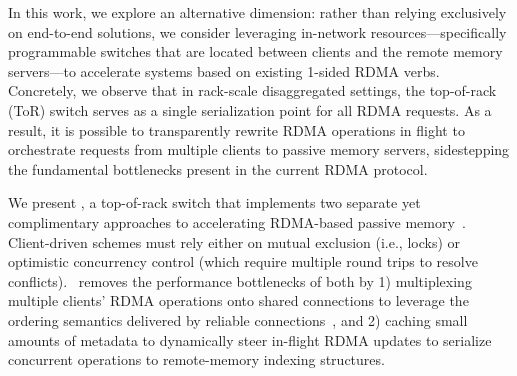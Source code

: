
In this work, we explore an alternative dimension: rather than relying
exclusively on end-to-end solutions, we consider leveraging in-network
resources---specifically programmable switches that are located between
clients and the remote memory servers---to accelerate systems based on
existing 1-sided RDMA verbs.  Concretely, we observe that in
rack-scale disaggregated settings, the top-of-rack (ToR) switch serves as a
single serialization point for all RDMA requests.  As a result, it is
possible to transparently rewrite RDMA operations in flight to
orchestrate requests from multiple clients to passive memory servers,
sidestepping the fundamental bottlenecks present in the current
RDMA protocol.



We present \sword, a top-of-rack switch that implements two separate
yet complimentary approaches to accelerating RDMA-based passive
memory~\cite{Grant2021InContRes}.  Client-driven schemes must rely
either on mutual exclusion (i.e., locks) or optimistic concurrency
control (which require multiple round trips to resolve conflicts).
\sword\ removes the performance bottlenecks of both by 1) multiplexing
multiple clients' RDMA operations onto shared connections to leverage
the ordering semantics delivered by reliable connections~\cite{flock},
and 2) caching small amounts of metadata to dynamically steer
in-flight RDMA updates to serialize concurrent operations to
remote-memory indexing structures.

